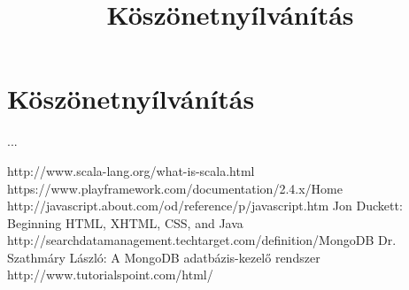 \documentclass[a4paper, 12pt, oneside]{book}
\begin{document}
\chapter*{Köszönetnyílvánítás}
\title{Köszönetnyílvánítás}
...

\newpage
{}
\begin{thebibliography}{11}
http://www.scala-lang.org/what-is-scala.html
https://www.playframework.com/documentation/2.4.x/Home
http://javascript.about.com/od/reference/p/javascript.htm
Jon Duckett: Beginning HTML, XHTML, CSS, and Java
http://searchdatamanagement.techtarget.com/definition/MongoDB
Dr. Szathmáry László: A MongoDB adatbázis-kezelő rendszer
http://www.tutorialspoint.com/html/

\end{thebibliography}
\end{document}
